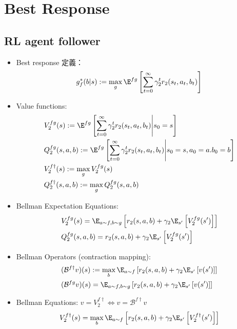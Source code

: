 \documentclass[a4paper,10pt,dvipdfmx]{jsarticle}
\begin{document}
\section{Best Response}

\subsection{RL agent follower}

\begin{itemize}
    \item Best response 定義：
    \begin{gather}
        g_f^*(b|s):=\max_{g}\E^{fg}\left[\sum_{t=0}^\infty \gamma_2^tr_2(s_t,a_t,b_t)\right]
    \end{gather}
    \item Value functions:
    \begin{align}
        &V_2^{fg}(s):=\E^{fg}\left[\sum_{t=0}^\infty \gamma_2^tr_2(s_t,a_t,b_t)\middle|s_0=s\right]\\
        &Q_2^{fg}(s,a,b):=\E^{fg}\left[\sum_{t=0}^\infty \gamma_2^tr_2(s_t,a_t,b_t)\middle|s_0=s,a_0=a.b_0=b\right]\\
        &V_2^{f\dag}(s):=\max_{g}V_2^{fg}(s)\\
        &Q_2^{f\dag}(s,a,b):=\max_{g}Q_2^{fg}(s,a,b)
    \end{align}
    \item Bellman Expectation Equations:
    \begin{align}
        &V_2^{fg}(s)=\E_{a\sim f,b\sim g}\left[r_2(s,a,b)+\gamma_2\E_{s'}\left[V_2^{fg}(s')\right]\right]\\
        &Q_2^{fg}(s,a,b)=r_2(s,a,b)+\gamma_2\E_{s'}\left[V_2^{fg}(s')\right]
    \end{align}
    \item Bellman Operators (contraction mapping):
    \begin{align}
        &(\mathcal{B}^{f\dag}v)(s):=\max_{b}\E_{a\sim f}\left[r_2(s,a,b)+\gamma_2\E_{s'}\left[v(s')\right]\right]\\
        &(\mathcal{B}^{fg}v)(s)=\E_{a\sim f,b\sim g}\left[r_2(s,a,b)+\gamma_2\E_{s'}\left[v(s')\right]\right]
    \end{align}
    \item Bellman Equations: $v=V_2^{f\dag}\iff v=\mathcal{B}^{f\dag}v$
    \begin{align}
        V_2^{f\dag}(s)=\max_{b}\E_{a\sim f}\left[r_2(s,a,b)+\gamma_2\E_{s'}\left[V_2^{f\dag}(s')\right]\right]
    \end{align}

\end{itemize}
\end{document}
